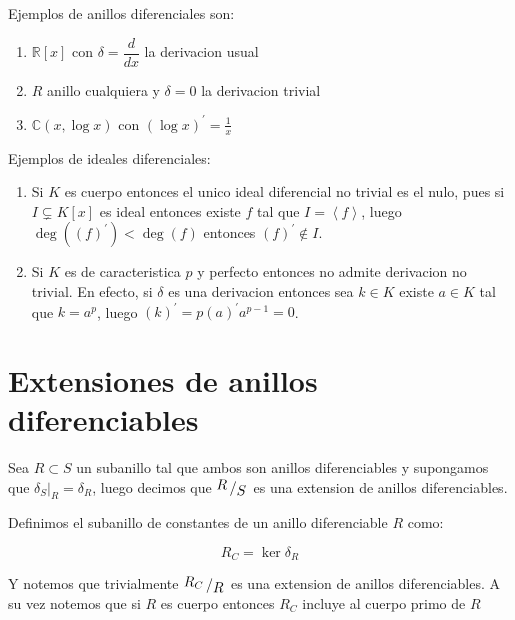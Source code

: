 \documentclass[11pt]{article}
\newcommand{\C}{\mathbb{C}}
\newcommand{\R}{{\mathbb{R}}}
\newcommand{\ip}[1]{\left\langle#1\right\rangle}
\newcommand{\quotient}[2]{{\raisebox{.2em}{$#1$}\left/\raisebox{-.2em}{$#2$}\right.}}
\newcommand{\derivation}[1]{\left(#1\right)^\prime}
\newcommand{\constants}[1]{#1_C}
\numberwithin{theorem}{subsection}
\newenvironment{definition}[1][Definici\'on]{\begin{trivlist}
		\item[\hskip \labelsep {\bfseries #1}]}{\end{trivlist}}
\newenvironment{example}[1][Ejemplo]{\begin{trivlist}
		\item[\hskip \labelsep {\bfseries #1 }]}{\end{trivlist}}
\begin{document}
\begin{example}
	Ejemplos de anillos diferenciales son:
	
	\begin{enumerate}
		\item $\R[x]$ con $\delta = \dfrac{d}{dx}$ la derivacion usual
		\item $R$ anillo cualquiera y $\delta = 0$ la derivacion trivial
		\item $\C(x, \log x)$ con $\derivation{\log x} = \frac{1}{x}$
	\end{enumerate}

	Ejemplos de ideales diferenciales:
	
	\begin{enumerate}
		\item Si $K$ es cuerpo entonces el unico ideal diferencial no trivial es el nulo, pues si $I \subsetneq K[x]$ es ideal entonces existe $f$ tal que $I = \ip{f}$, luego $\deg\left(\derivation{f}\right) < \deg(f)$ entonces $\derivation{f} \not \in I$.
		\item Si $K$ es de caracteristica $p$ y perfecto entonces no admite derivacion no trivial. En efecto, si $\delta$ es una derivacion entonces sea $k \in K$ existe $a \in K$ tal que $k = a^p$, luego $\derivation{k} = p \derivation{a} a^{p-1} = 0$.
	\end{enumerate}

\end{example}

\section{Extensiones de anillos diferenciables}

Sea $R \subset S$ un subanillo tal que ambos son anillos diferenciables y supongamos que $\delta_S \vert_R = \delta_R$, luego decimos que $\quotient{R}{S}$ es una extension de anillos diferenciables.

\begin{definition}
	Definimos el subanillo de constantes de un anillo diferenciable $R$ como:
	
	\begin{equation}
		\constants{R} = \ker \delta_R
	\end{equation}
	
	Y notemos que trivialmente $\quotient{\constants{R}}{R}$ es una extension de anillos diferenciables. A su vez notemos que si $R$ es cuerpo entonces $\constants{R}$ incluye al cuerpo primo de $R$
	
\end{definition}
\end{document}
